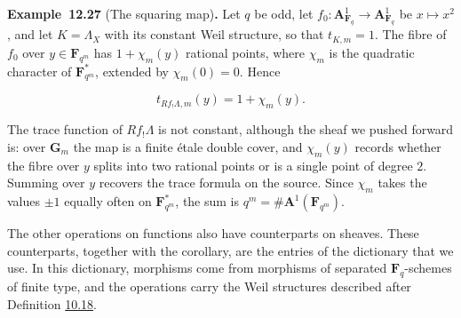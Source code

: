 \documentclass[11pt]{article}
\newenvironment{bpstatement}[2]{\par\addvspace{0.6\baselineskip}\noindent\textbf{#1}#2\textbf{.}\enspace\ignorespaces}
  {\par\addvspace{0.4\baselineskip}}
\begin{document}
\label{bp307}%
\begin{bpstatement}{Example~12.27}{ (The squaring map)}
Let \(q\) be odd, let \(f_0:\mathbf A^1_{\mathbf F_q}\to\mathbf A^1_{\mathbf F_q}\) be \(x\mapsto x^2\), and let \(K=\Lambda_X\) with its constant Weil structure, so that \(t_{K,m}=1\). The fibre of \(f_0\) over \(y\in\mathbf F_{q^m}\) has \(1+\chi_m(y)\) rational points, where \(\chi_m\) is the quadratic character of \(\mathbf F_{q^m}^*\), extended by \(\chi_m(0)=0\). Hence

\[
t_{Rf_!\Lambda,m}(y)=1+\chi_m(y).
\]

The trace function of \(Rf_!\Lambda\) is not constant, although the sheaf we pushed forward is: over \(\mathbf G_m\) the map is a finite étale double cover, and \(\chi_m(y)\) records whether the fibre over \(y\) splits into two rational points or is a single point of degree \(2\). Summing over \(y\) recovers the trace formula on the source. Since \(\chi_m\) takes the values \(\pm1\) equally often on \(\mathbf F_{q^m}^*\), the sum is \(q^m=\#\mathbf A^1(\mathbf F_{q^m})\).
\end{bpstatement}

\label{bp308}%
The other operations on functions also have counterparts on sheaves. These counterparts, together with the corollary, are the entries of the dictionary that we use. In this dictionary, morphisms come from morphisms of separated \(\mathbf F_q\)-schemes of finite type, and the operations carry the Weil structures described after Definition \hyperref[bp156]{10.18}.
\end{document}
